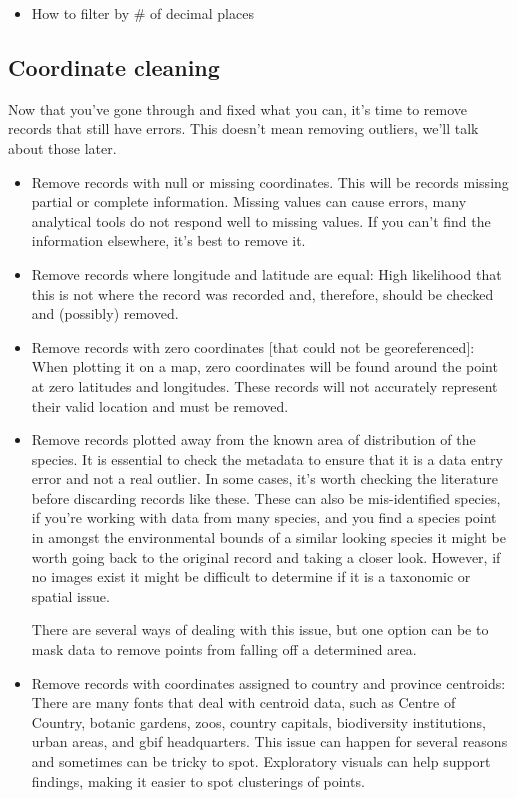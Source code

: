 \documentclass[
  letterpaper,
  DIV=11,
  numbers=noendperiod,
  oneside]{scrreprt}
\begin{document}
\begin{itemize}
\item
  How to filter by \# of decimal places
\end{itemize}

\hypertarget{coordinate-cleaning}{%
\subsection{Coordinate cleaning}\label{coordinate-cleaning}}

Now that you've gone through and fixed what you can, it's time to remove
records that still have errors. This doesn't mean removing outliers,
we'll talk about those later.

\begin{itemize}
\item
  Remove records with null or missing coordinates. This will be records
  missing partial or complete information. Missing values can cause
  errors, many analytical tools do not respond well to missing values.
  If you can't find the information elsewhere, it's best to remove it.
\item
  Remove records where longitude and latitude are equal: High likelihood
  that this is not where the record was recorded and, therefore, should
  be checked and (possibly) removed.
\item
  Remove records with zero coordinates {[}that could not be
  georeferenced{]}: When plotting it on a map, zero coordinates will be
  found around the point at zero latitudes and longitudes. These records
  will not accurately represent their valid location and must be
  removed.
\item
  Remove records plotted away from the known area of distribution of the
  species. It is essential to check the metadata to ensure that it is a
  data entry error and not a real outlier. In some cases, it's worth
  checking the literature before discarding records like these. These
  can also be mis-identified species, if you're working with data from
  many species, and you find a species point in amongst the
  environmental bounds of a similar looking species it might be worth
  going back to the original record and taking a closer look. However,
  if no images exist it might be difficult to determine if it is a
  taxonomic or spatial issue.

  There are several ways of dealing with this issue, but one option can
  be to mask data to remove points from falling off a determined area.
\item
  Remove records with coordinates assigned to country and province
  centroids: There are many fonts that deal with centroid data, such as
  Centre of Country, botanic gardens, zoos, country capitals,
  biodiversity institutions, urban areas, and gbif headquarters. This
  issue can happen for several reasons and sometimes can be tricky to
  spot. Exploratory visuals can help support findings, making it easier
  to spot clusterings of points.


\end{itemize}
\end{document}
